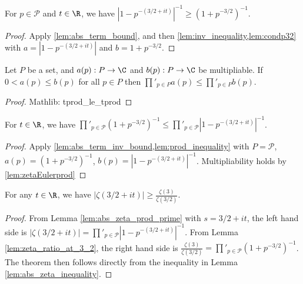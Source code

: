 \begin{lemma}\label{lem:abs_term_inv_bound} 
\leanok
{}
For $p\in\mathcal{P}$ and $t\in\R$, we have $|1 - p^{-(3/2+it)}|^{-1} \ge (1 + p^{-3/2})^{-1}$.
\end{lemma}
\begin{proof}
\leanok
{}
Apply \cref{lem:abs_term_bound}, and then \cref{lem:inv_inequality,lem:condp32} with $a = |1 - p^{-(3/2+it)}|$ and $b=1 + p^{-3/2}$.
\end{proof}

\begin{lemma}\label{lem:prod_inequality} 
\leanok
Let $P$ be a set, and $a(p):P\to\C$ and $b(p):P\to\C$ be multipliable. If $0 < a(p) \le b(p)$ for all $p\in P$ then $\prod'_{p\in P} a(p) \le \prod'_{p\in P} b(p)$.
\end{lemma}
\begin{proof}
\leanok
Mathlib: tprod\_le\_tprod
\end{proof}

\begin{lemma}\label{lem:abs_zeta_inequality} 
\leanok
{}
For $t\in\R$, we have $\prod'_{p\in\mathcal{P}}(1 + p^{-3/2})^{-1} \le \prod'_{p\in\mathcal{P}}|1 - p^{-(3/2+it)}|^{-1}$.
\end{lemma}
\begin{proof}
\leanok
Apply \cref{lem:abs_term_inv_bound,lem:prod_inequality} with $P=\mathcal{P}$, $a(p) = (1 + p^{-3/2})^{-1}$, $b(p)=|1 - p^{-(3/2+it)}|^{-1}$. Multipliability holds by \cref{lem:zetaEulerprod}
\end{proof}

\begin{theorem}\label{thm:zeta_lower_bound} 
\leanok
For any $t\in\R$, we have $|\zeta(3/2+it)| \ge \frac{\zeta(3)}{\zeta(3/2)}$.
\end{theorem}
\begin{proof} \leanok
{}
From Lemma \ref{lem:abs_zeta_prod_prime} with $s=3/2+it$, the left hand side is $|\zeta(3/2+it)| = \prod'_{p\in\mathcal{P}}|1 - p^{-(3/2+it)}|^{-1}$.
From Lemma \ref{lem:zeta_ratio_at_3_2}, the right hand side is $\frac{\zeta(3)}{\zeta(3/2)} = \prod'_{p\in\mathcal{P}}(1+p^{-3/2})^{-1}$.
The theorem then follows directly from the inequality in Lemma \ref{lem:abs_zeta_inequality}.
\end{proof}


